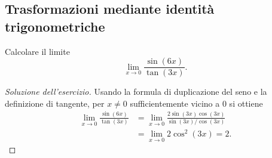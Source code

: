 \subsection{Trasformazioni mediante identità trigonometriche}
\label{sec:esercizi-limiti-identita-trigonometriche}

\begin{exercise}
\label{ex:limiti-foglio-2311-25}
Calcolare il limite
\[
  \lim_{x\to0}\frac{\sin(6x)}{\tan(3x)}.
\]
\end{exercise}
\begin{proof}[Soluzione dell'esercizio]
Usando la formula di duplicazione del seno e la definizione di tangente,
per $x\ne0$ sufficientemente vicino a $0$ si ottiene
\[
\begin{aligned}
  \lim_{x\to0}\frac{\sin(6x)}{\tan(3x)}
    &=\lim_{x\to0}
      \frac{2\sin(3x)\cos(3x)}{\sin(3x)/\cos(3x)}\\
    &=\lim_{x\to0}2\cos^2(3x)=2.
\end{aligned}
\]
\end{proof}
